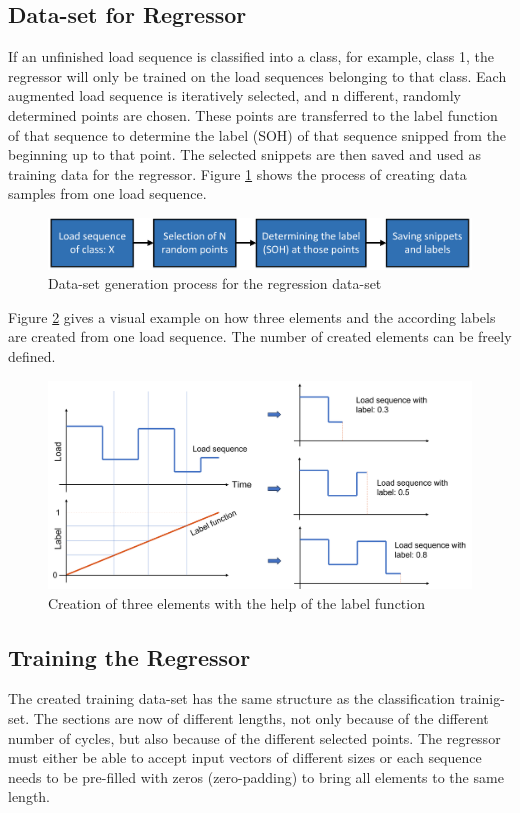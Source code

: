 \subsection{Data-set for Regressor}\label{PrRe}
If an unfinished load sequence is classified into a class, for example, class 1, the regressor will only be trained on the load sequences belonging to that class. Each augmented load sequence is iteratively selected, and n different, randomly determined points are chosen. These points are transferred to the label function of that sequence to determine the label (SOH) of that sequence snipped from the beginning up to that point. The selected snippets are then saved and used as training data for the regressor. 
Figure \ref{fig:dataregressor} shows the process of creating data samples from one load sequence.

\begin{figure}[H]
	\centering
	\includegraphics[width=0.85\linewidth]{IMGs/dataregressor.png}
	\caption{Data-set generation process for the regression data-set}
	\label{fig:dataregressor}
\end{figure}

Figure \ref{fig:4elems} gives a visual example on how three elements and the according labels are created from one load sequence. The number of created elements can be freely defined.

\begin{figure}[H]
	\centering
	\includegraphics[width=0.95\linewidth]{IMGs/4elems.png}
	\caption{Creation of three elements with the help of the label function}
	\label{fig:4elems}
\end{figure}
\subsection{Training the Regressor}
The created training data-set has the same structure as the classification trainig-set. The sections are now of different lengths, not only because of the different number of cycles, but also because of the different selected points. The regressor must either be able to accept input vectors of different sizes or each sequence needs to be pre-filled with zeros (zero-padding) to bring all elements to the same length.
